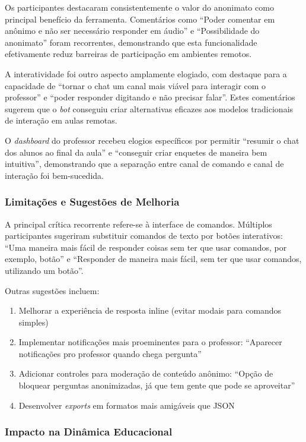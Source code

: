 Os participantes destacaram consistentemente o valor do anonimato como principal
benefício da ferramenta. Comentários como ``Poder comentar em anônimo e não ser
necessário responder em áudio'' e ``Possibilidade do anonimato'' foram
recorrentes, demonstrando que esta funcionalidade efetivamente reduz barreiras
de participação em ambientes remotos.

A interatividade foi outro aspecto amplamente elogiado, com destaque para a
capacidade de ``tornar o chat um canal mais viável para interagir com o
professor'' e ``poder responder digitando e não precisar falar''. Estes
comentários sugerem que o \textit{bot} conseguiu criar alternativas eficazes aos
modelos tradicionais de interação em aulas remotas.

O \textit{dashboard} do professor recebeu elogios específicos por permitir
``resumir o chat dos alunos ao final da aula'' e ``conseguir criar enquetes de
maneira bem intuitiva'', demonstrando que a separação entre canal de comando e
canal de interação foi bem-sucedida.

\subsubsection{Limitações e Sugestões de Melhoria}
\label{subsec:limites-sugestoes-melhoria}

A principal crítica recorrente refere-se à interface de comandos. Múltiplos
participantes sugeriram substituir comandos de texto por botões interativos:
``Uma maneira mais fácil de responder coisas sem ter que usar comandos, por
exemplo, botão'' e ``Responder de maneira mais fácil, sem ter que usar comandos,
utilizando um botão''.

Outras sugestões incluem:
\begin{enumerate}
\item Melhorar a experiência de resposta inline (evitar modais para comandos
simples)
\item Implementar notificações mais proeminentes para o professor: ``Aparecer
notificações pro professor quando chega pergunta''
\item Adicionar controles para moderação de conteúdo anônimo: ``Opção de
bloquear perguntas anonimizadas, já que tem gente que pode se aproveitar''
\item Desenvolver \textit{exports} em formatos mais amigáveis que JSON
\end{enumerate}

\subsubsection{Impacto na Dinâmica Educacional}
\label{subsec:impacto-dinamica-educacional}

